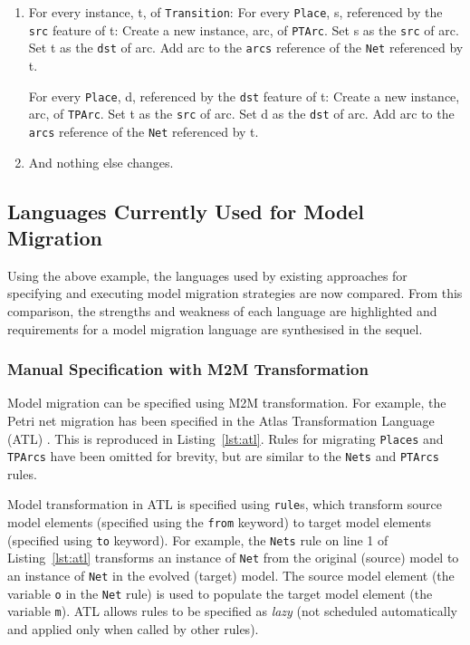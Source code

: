 \begin{enumerate}
	\item For every instance, t, of \texttt{Transition}: 
	\subitem For every \texttt{Place}, s, referenced by the \texttt{src} feature of t: 
	\subsubitem Create a new instance, arc, of \texttt{PTArc}. 
	\subsubitem Set s as the \texttt{src} of arc. 
	\subsubitem Set t as the \texttt{dst} of arc. 
	\subsubitem Add arc to the \texttt{arcs} reference of the \texttt{Net} referenced by t.
	
	\subitem For every \texttt{Place}, d, referenced by the \texttt{dst} feature of t: 
	\subsubitem Create a new instance, arc, of \texttt{TPArc}. 
	\subsubitem Set t as the \texttt{src} of arc. 
	\subsubitem Set d as the \texttt{dst} of arc. 
	\subsubitem Add arc to the \texttt{arcs} reference of the \texttt{Net} referenced by t.
	
	\item And nothing else changes.
\end{enumerate}

\subsection{Languages Currently Used for Model Migration}
\label{subsec:existing_migration_languages}
Using the above example, the languages used by existing approaches for specifying and executing model migration strategies are now compared. From this comparison, the strengths and weakness of each language are highlighted and requirements for a model migration language are synthesised in the sequel.

\subsubsection{Manual Specification with M2M Transformation}
\label{subsubsec:m2m}
Model migration can be specified using M2M transformation. For example, the Petri net migration has been specified in the Atlas Transformation Language (ATL) \cite{jouault05transforming}. This is reproduced in Listing~\ref{lst:atl}. Rules for migrating \texttt{Places} and \texttt{TPArcs} have been omitted for brevity, but are similar to the \texttt{Nets} and \texttt{PTArcs} rules.

Model transformation in ATL is specified using \texttt{rule}s, which transform source model elements (specified using the \texttt{fr\-om} keyword) to target model elements (specified using \texttt{to} keyword). For example, the \texttt{Nets} rule on line 1 of Listing~\ref{lst:atl} transforms an instance of \texttt{Net} from the original (source) model to an instance of \texttt{Net} in the evolved (target) model. The source model element (the variable \texttt{o} in the \texttt{Net} rule) is used to populate the target model element (the variable \texttt{m}). ATL allows rules to be specified as \emph{lazy} (not scheduled automatically and applied only when called by other rules).

